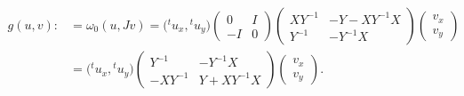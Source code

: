 \documentclass[pdftex]{sigma}
\numberwithin{equation}{section}
\begin{document}
\begin{align}
g(u, v):&=\omega_0(u,Jv)=\bigl({}^tu_x, {}^tu_y\bigr)
\begin{pmatrix}
0 & I \\
-I & 0
\end{pmatrix}
\begin{pmatrix}
XY^{-1} & -Y-XY^{-1}X \\
Y^{-1} & -Y^{-1}X
\end{pmatrix}
\begin{pmatrix}
v_x\\
v_y
\end{pmatrix}\nonumber\\
&=\bigl({}^tu_x, {}^tu_y\bigr)
\begin{pmatrix}
Y^{-1} & -Y^{-1}X \\
-XY^{-1} & Y+XY^{-1}X
\end{pmatrix}
\begin{pmatrix}
v_x\\
v_y
\end{pmatrix}.\label{g}
\end{align}
\end{document}
